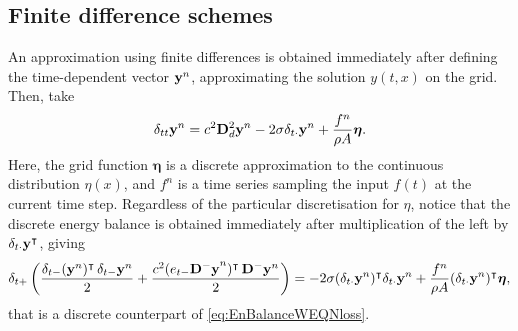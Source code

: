 \subsection{Finite difference schemes}

An approximation using finite differences is obtained immediately after defining the time-dependent vector ${\bf y}^n$, approximating the solution $y(t,x)$ on the grid. Then, take
\begin{equation}
\delta_{tt} {\bf y}^n = c^2 {\bf D}^2_d {\bf y}^n - 2\sigma \delta_{t\cdot} {\bf y}^n + \frac{f^n}{\rho A}{\boldsymbol \eta}.
\end{equation}
Here, the grid function ${\boldsymbol \eta}$ is a discrete approximation to the continuous distribution $\eta(x)$, and $f^n$ is a time series sampling the input $f(t)$ at the current time step. Regardless of the particular discretisation for $\eta$, notice that the discrete energy balance is obtained immediately after multiplication of the left by $\delta_{t\cdot} {\bf y}^\intercal$, giving
\begin{equation}
\delta_{t+} \left(\frac{\delta_{t-} ({\bf y}^n)^\intercal \, \delta_{t-} {\bf y}^n}{2} + \frac{c^2(e_{t-} {\bf {\bf D}^-{\bf y}}^n)^\intercal \, {\bf D}^-{\bf y}^n}{2} \right) = -2\sigma (\delta_{t\cdot} {\bf y}^n)^\intercal \delta_{t\cdot} {\bf y}^n +  \frac{f^n}{\rho A}(\delta_{t\cdot} {\bf y}^n)^\intercal {\boldsymbol \eta},
\end{equation}
that is a discrete counterpart of \eqref{eq:EnBalanceWEQNloss}. 


